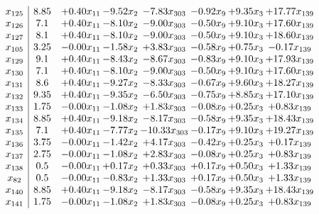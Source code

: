 \documentclass[8pt]{article}
\begin{document}
\[\begin{array}{c| c c@{\hskip 2pt} c@{\hskip 2pt} c@{\hskip 2pt} c@{\hskip 2pt} c@{\hskip 2pt} c@{\hskip 2pt} }
 x_{125}   &  8.85 & +  0.40 x_{11} & -9.52 x_{2} & -7.83 x_{303} & -0.92 x_{9} & +  9.35 x_{3} & + 17.77 x_{139}\\
 x_{126}   &  7.1 & +  0.40 x_{11} & -8.10 x_{2} & -9.00 x_{303} & -0.50 x_{9} & +  9.10 x_{3} & + 17.60 x_{139}\\
 x_{127}   &  8.1 & +  0.40 x_{11} & -8.10 x_{2} & -9.00 x_{303} & -0.50 x_{9} & +  9.10 x_{3} & + 18.60 x_{139}\\
 x_{105}   &  3.25 & -0.00 x_{11} & -1.58 x_{2} & +  3.83 x_{303} & -0.58 x_{9} & +  0.75 x_{3} & -0.17 x_{139}\\
 x_{129}   &  9.1 & +  0.40 x_{11} & -8.43 x_{2} & -8.67 x_{303} & -0.83 x_{9} & +  9.10 x_{3} & + 17.93 x_{139}\\
 x_{130}   &  7.1 & +  0.40 x_{11} & -8.10 x_{2} & -9.00 x_{303} & -0.50 x_{9} & +  9.10 x_{3} & + 17.60 x_{139}\\
 x_{131}   &  8.6 & +  0.40 x_{11} & -9.27 x_{2} & -8.33 x_{303} & -0.67 x_{9} & +  9.60 x_{3} & + 18.27 x_{139}\\
 x_{132}   &  9.35 & +  0.40 x_{11} & -9.35 x_{2} & -6.50 x_{303} & -0.75 x_{9} & +  8.85 x_{3} & + 17.10 x_{139}\\
 x_{133}   &  1.75 & -0.00 x_{11} & -1.08 x_{2} & +  1.83 x_{303} & -0.08 x_{9} & +  0.25 x_{3} & +  0.83 x_{139}\\
 x_{134}   &  8.85 & +  0.40 x_{11} & -9.18 x_{2} & -8.17 x_{303} & -0.58 x_{9} & +  9.35 x_{3} & + 18.43 x_{139}\\
 x_{135}   &  7.1 & +  0.40 x_{11} & -7.77 x_{2} & -10.33 x_{303} & -0.17 x_{9} & +  9.10 x_{3} & + 19.27 x_{139}\\
 x_{136}   &  3.75 & -0.00 x_{11} & -1.42 x_{2} & +  4.17 x_{303} & -0.42 x_{9} & +  0.25 x_{3} & +  0.17 x_{139}\\
 x_{137}   &  2.75 & -0.00 x_{11} & -1.08 x_{2} & +  2.83 x_{303} & -0.08 x_{9} & +  0.25 x_{3} & +  0.83 x_{139}\\
 x_{138}   &  0.5 & -0.00 x_{11} & +  0.17 x_{2} & +  0.33 x_{303} & +  0.17 x_{9} & +  0.50 x_{3} & +  1.33 x_{139}\\
 x_{82}   &  0.5 & -0.00 x_{11} & -0.83 x_{2} & +  1.33 x_{303} & +  0.17 x_{9} & +  0.50 x_{3} & +  1.33 x_{139}\\
 x_{140}   &  8.85 & +  0.40 x_{11} & -9.18 x_{2} & -8.17 x_{303} & -0.58 x_{9} & +  9.35 x_{3} & + 18.43 x_{139}\\
 x_{141}   &  1.75 & -0.00 x_{11} & -1.08 x_{2} & +  1.83 x_{303} & -0.08 x_{9} & +  0.25 x_{3} & +  0.83 x_{139}\\

\end{array}\]
\end{document}
